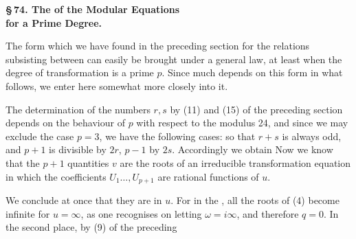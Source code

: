 
\begin{center}
\textbf{\S\,74. The  of the  Modular Equations}\\
\textbf{for a Prime Degree.}
\end{center}

The form which we have found in the preceding section for the relations
subsisting between
can easily be brought under a general law, at least when the degree of
transformation is a prime $p$. Since much depends on this form in what
follows, we enter here somewhat more closely into it.

The determination of the numbers $r, s$ by (11) and (15) of the
preceding section depends on the behaviour of $p$ with respect to the
modulus 24, and since we may exclude the case $p=3$, we have the
following cases:
so that $r+s$ is always odd, and $p+1$ is divisible by $2r$, $p-1$
by $2s$. Accordingly we obtain
Now we know that the $p+1$ quantities $v$ are the roots of an
irreducible transformation equation
in which the coefficients $U_1\ldots, U_{p+1}$ are rational
functions of $u$.

We conclude at once that they are  in $u$.
For in the , all the roots of (4) become
infinite for $u=\infty$, as one recognises on letting $\omega=i\infty$,
and therefore $q=0$. In the second place, by (9) of the preceding
